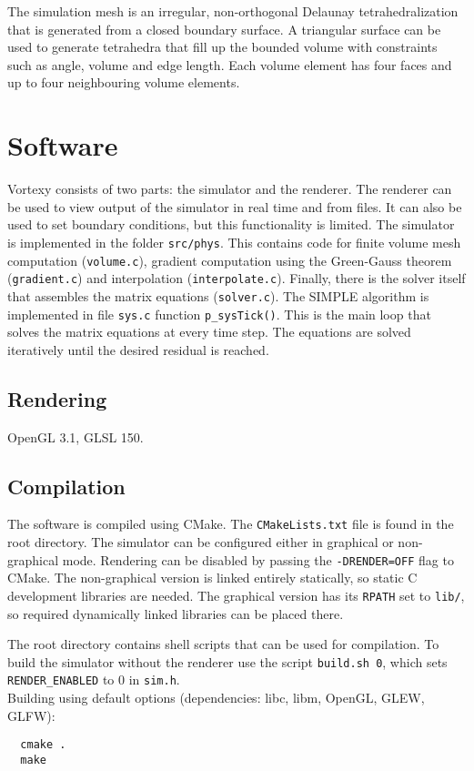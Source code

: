 \documentclass[12pt]{article}
\begin{document}
The simulation mesh is an irregular, non-orthogonal Delaunay tetrahedralization that is generated from a closed boundary surface. A triangular surface can be used to generate tetrahedra that fill up the bounded volume with constraints such as angle, volume and edge length. Each volume element has four faces and up to four neighbouring volume elements.

\section{Software}

Vortexy consists of two parts: the simulator and the renderer. The renderer can be used to view output of the simulator in real time and from files. It can also be used to set boundary conditions, but this functionality is limited. The simulator is implemented in the folder \verb|src/phys|. This contains code for finite volume mesh computation (\verb|volume.c|), gradient computation using the Green-Gauss theorem (\verb|gradient.c|) and interpolation (\verb|interpolate.c|). Finally, there is the solver itself that assembles the matrix equations (\verb|solver.c|). The SIMPLE algorithm is implemented in file \verb|sys.c| function \verb|p_sysTick()|. This is the main loop that solves the matrix equations at every time step. The equations are solved iteratively until the desired residual is reached.

\subsection{Rendering}

OpenGL 3.1, GLSL 150.

\subsection{Compilation}

The software is compiled using CMake. The \verb|CMakeLists.txt| file is found in the root directory. The simulator can be configured either in graphical or non-graphical mode. Rendering can be disabled by passing the \verb|-DRENDER=OFF| flag to CMake. The non-graphical version is linked entirely statically, so static C development libraries are needed. The graphical version has its \verb|RPATH| set to \verb|lib/|, so required dynamically linked libraries can be placed there.

The root directory contains shell scripts that can be used for compilation. To build the simulator without the renderer use the script \verb|build.sh 0|, which sets \verb|RENDER_ENABLED| to 0 in \verb|sim.h|.\\
Building using default options (dependencies: libc, libm, OpenGL, GLEW, GLFW):
\begin{verbatim}
  cmake .
  make
\end{verbatim}
\end{document}
